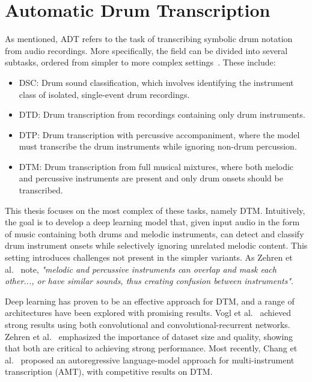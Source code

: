 \section{Automatic Drum Transcription}

As mentioned, \acrfull{ADT} refers to the task of transcribing symbolic drum notation from audio recordings. More specifically, the field can be divided into several subtasks, ordered from simpler to more complex settings~\cite{8350302}. These include:
\begin{itemize}
    \item \acrshort{DSC}: Drum sound classification, which involves identifying the instrument class of isolated, single-event drum recordings.
    \item \acrshort{DTD}: Drum transcription from recordings containing only drum instruments.
    \item \acrshort{DTP}: Drum transcription with percussive accompaniment, where the model must transcribe the drum instruments while ignoring non-drum percussion.
    \item \acrshort{DTM}: Drum transcription from full musical mixtures, where both melodic and percussive instruments are present and only drum onsets should be transcribed.
\end{itemize}

This thesis focuses on the most complex of these tasks, namely \acrfull{DTM}. Intuitively, the goal is to develop a deep learning model that, given input audio in the form of music containing both drums and melodic instruments, can detect and classify drum instrument onsets while selectively ignoring unrelated melodic content. This setting introduces challenges not present in the simpler variants. As Zehren et al.~\cite{signals4040042} note, \textit{"melodic and percussive instruments can overlap and mask each other..., or have similar sounds, thus creating confusion between instruments"}.

Deep learning has proven to be an effective approach for \gls{DTM}, and a range of architectures have been explored with promising results. Vogl et al.~\cite{Vogl2017DrumTV, vogl2018multiinstrumentdrumtranscription} achieved strong results using both convolutional and convolutional-recurrent networks. Zehren et al.~\cite{signals4040042, zehren2024analyzingreducingsynthetictorealtransfer} emphasized the importance of dataset size and quality, showing that both are critical to achieving strong performance. Most recently, Chang et al.~\cite{chang2024yourmt3+} proposed an autoregressive language-model approach for multi-instrument transcription (\gls{AMT}), with competitive results on \gls{DTM}.

